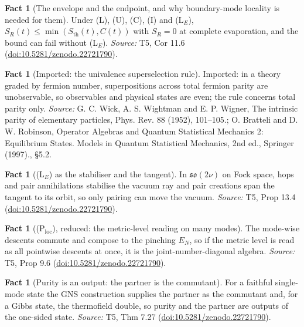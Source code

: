 \documentclass[11pt]{article}
\theoremstyle{definition}
\newtheorem{fact}[theorem]{Fact}
\theoremstyle{plain}
\providecommand{\EN}{}\renewcommand{\EN}{E_{N}}
\providecommand{\Sth}{}\renewcommand{\Sth}{S_{\mathrm{th}}}
\begin{document}
\begin{fact}[The envelope and the endpoint, and why boundary-mode locality is needed for them]\label{c:singularity.envelope-endpoint-why-boundary-mode-locality}
Under (L), (U), (C), (I) and (L$_E$), $S_R(t) \leq \min(\Sth(t), C(t))$ with $S_R = 0$ at complete evaporation, and the bound can fail without (L$_E$).
\emph{Source:} T5, Cor 11.6 (\href{https://doi.org/10.5281/zenodo.22721790}{doi:10.5281/zenodo.22721790}).
\end{fact}

\begin{fact}[Imported: the univalence superselection rule]\label{c:singularity.imported-univalence-superselection-rule}
Imported: in a theory graded by fermion number, superpositions across total fermion parity are unobservable, so observables and physical states are even; the rule concerns total parity only.
\emph{Source:} G. C. Wick, A. S. Wightman and E. P. Wigner, The intrinsic parity of elementary particles, Phys. Rev. 88 (1952), 101--105.; O. Bratteli and D. W. Robinson, Operator Algebras and Quantum Statistical Mechanics 2: Equilibrium States. Models in Quantum Statistical Mechanics, 2nd ed., Springer (1997)., \S 5.2.
\end{fact}

\begin{fact}[(L$_E$) as the stabiliser and the tangent]\label{c:singularity.l-stabiliser-tangent}
In $\mathfrak{so}(2\nu)$ on Fock space, hops and pair annihilations stabilise the vacuum ray and pair creations span the tangent to its orbit, so only pairing can move the vacuum.
\emph{Source:} T5, Prop 13.4 (\href{https://doi.org/10.5281/zenodo.22721790}{doi:10.5281/zenodo.22721790}).
\end{fact}

\begin{fact}[(P$_{\mathrm{loc}}$), reduced: the metric-level reading on many modes]\label{c:singularity.p-reduced-metric-level-reading-many}
The mode-wise descents commute and compose to the pinching $\EN$, so if the metric level is read as all pointwise descents at once, it is the joint-number-diagonal algebra.
\emph{Source:} T5, Prop 9.6 (\href{https://doi.org/10.5281/zenodo.22721790}{doi:10.5281/zenodo.22721790}).
\end{fact}

\begin{fact}[Purity is an output: the partner is the commutant]\label{c:singularity.purity-output-partner-commutant}
For a faithful single-mode state the GNS construction supplies the partner as the commutant and, for a Gibbs state, the thermofield double, so purity and the partner are outputs of the one-sided state.
\emph{Source:} T5, Thm 7.27 (\href{https://doi.org/10.5281/zenodo.22721790}{doi:10.5281/zenodo.22721790}).
\end{fact}
\end{document}
